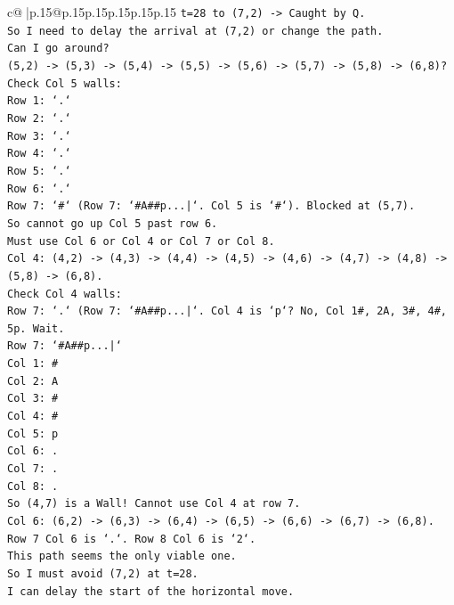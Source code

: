 \documentclass{article}
\begin{document}
{\begin{supertabular}{c@{$\;$}|p{.15\linewidth}@{}p{.15\linewidth}p{.15\linewidth}p{.15\linewidth}p{.15\linewidth}p{.15\linewidth}}
{{{\texttt{t=28 to (7,2) {-}> Caught by Q.} \\
\texttt{So I need to delay the arrival at (7,2) or change the path.} \\
\texttt{Can I go around?} \\
\texttt{(5,2) {-}> (5,3) {-}> (5,4) {-}> (5,5) {-}> (5,6) {-}> (5,7) {-}> (5,8) {-}> (6,8)?} \\
\texttt{Check Col 5 walls:} \\
\texttt{Row 1: `.`} \\
\texttt{Row 2: `.`} \\
\texttt{Row 3: `.`} \\
\texttt{Row 4: `.`} \\
\texttt{Row 5: `.`} \\
\texttt{Row 6: `.`} \\
\texttt{Row 7: `\#` (Row 7: `\#A\#\#p...|`. Col 5 is `\#`). Blocked at (5,7).} \\
\texttt{So cannot go up Col 5 past row 6.} \\
\texttt{Must use Col 6 or Col 4 or Col 7 or Col 8.} \\
\texttt{Col 4: (4,2) {-}> (4,3) {-}> (4,4) {-}> (4,5) {-}> (4,6) {-}> (4,7) {-}> (4,8) {-}> (5,8) {-}> (6,8).} \\
\texttt{Check Col 4 walls:} \\
\texttt{Row 7: `.` (Row 7: `\#A\#\#p...|`. Col 4 is `p`? No, Col 1\#, 2A, 3\#, 4\#, 5p. Wait.} \\
\texttt{Row 7: `\#A\#\#p...|`} \\
\texttt{Col 1: \#} \\
\texttt{Col 2: A} \\
\texttt{Col 3: \#} \\
\texttt{Col 4: \#} \\
\texttt{Col 5: p} \\
\texttt{Col 6: .} \\
\texttt{Col 7: .} \\
\texttt{Col 8: .} \\
\texttt{So (4,7) is a Wall! Cannot use Col 4 at row 7.} \\
\texttt{Col 6: (6,2) {-}> (6,3) {-}> (6,4) {-}> (6,5) {-}> (6,6) {-}> (6,7) {-}> (6,8).} \\
\texttt{Row 7 Col 6 is `.`. Row 8 Col 6 is `2`.} \\
\texttt{This path seems the only viable one.} \\
\texttt{So I must avoid (7,2) at t=28.} \\
\texttt{I can delay the start of the horizontal move.} \\
}}}
\end{supertabular}}
\end{document}
